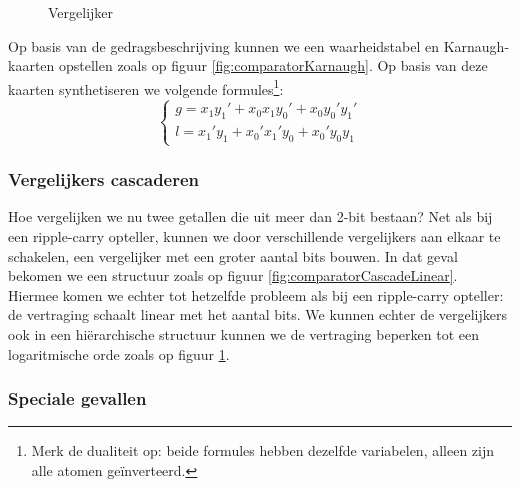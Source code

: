 \begin{figure}[hbt]
{
\label{fig:comparatorCascadeHierarchical}
}
\caption{Vergelijker}
\end{figure}
Op basis van de gedragsbeschrijving kunnen we een waarheidstabel en Karnaugh-kaarten opstellen zoals op figuur \ref{fig:comparatorKarnaugh}. Op basis van deze kaarten synthetiseren we volgende formules\footnote{Merk de dualiteit op: beide formules hebben dezelfde variabelen, alleen zijn alle atomen ge\"inverteerd.}:
\begin{equation}
\left\{\begin{array}{l}
g=x_1y_1'+x_0x_1y_0'+x_0y_0'y_1'\\
l=x_1'y_1+x_0'x_1'y_0+x_0'y_0y_1
\end{array}\right.
\end{equation}
\subsubsection{Vergelijkers cascaderen}
Hoe vergelijken we nu twee getallen die uit meer dan 2-bit bestaan? Net als bij een ripple-carry opteller, kunnen we door verschillende vergelijkers aan elkaar te schakelen, een vergelijker met een groter aantal bits bouwen. In dat geval bekomen we een structuur zoals op figuur \ref{fig:comparatorCascadeLinear}. Hiermee komen we echter tot hetzelfde probleem als bij een ripple-carry opteller: de vertraging schaalt linear met het aantal bits. We kunnen echter de vergelijkers ook in een hi\"erarchische structuur kunnen we de vertraging beperken tot een logaritmische orde zoals op figuur \ref{fig:comparatorCascadeHierarchical}.
\subsubsection{Speciale gevallen}
